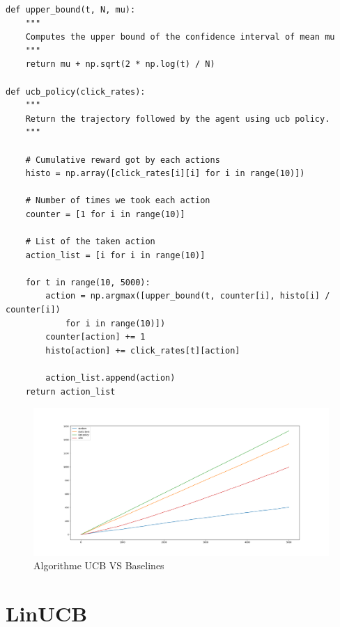 \documentclass[french]{article}
\begin{document}
	\begin{verbatim}
def upper_bound(t, N, mu):
	"""
	Computes the upper bound of the confidence interval of mean mu
	"""
	return mu + np.sqrt(2 * np.log(t) / N)

def ucb_policy(click_rates):
	"""
	Return the trajectory followed by the agent using ucb policy.
	"""
	
	# Cumulative reward got by each actions
	histo = np.array([click_rates[i][i] for i in range(10)])
	
	# Number of times we took each action
	counter = [1 for i in range(10)]

	# List of the taken action
	action_list = [i for i in range(10)]

	for t in range(10, 5000):
		action = np.argmax([upper_bound(t, counter[i], histo[i] / counter[i]) 
			for i in range(10)])
		counter[action] += 1
		histo[action] += click_rates[t][action]

		action_list.append(action)
	return action_list
	\end{verbatim}
	
		\begin{figure}[H]
		\centering
		\includegraphics[scale=0.3]{img/ucb.png}
		\caption{Algorithme UCB VS Baselines}
	\end{figure}
	
	\section{LinUCB}
	
\end{document}
